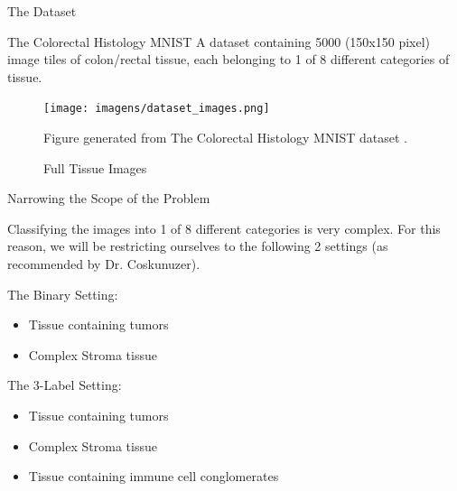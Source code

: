 \documentclass[11pt]{beamer}
\begin{document}
\begin{frame}{The Dataset}
    

    \begin{block}{The Colorectal Histology MNIST}
    A dataset containing 5000 (150x150 pixel) image tiles of colon/rectal tissue, each belonging to 1 of 8 different categories of tissue.
    \end{block}

    \begin{figure}
        \caption{Full Tissue Images}
        \label{fig:logo_UFES}
        \centering
        \texttt{[image: imagens/dataset\_images.png]}
        
        \medskip
        
        Figure generated from The Colorectal Histology MNIST dataset \cite{dataset}. 
    \end{figure}
\end{frame}

\begin{frame}{Narrowing the Scope of the Problem}
        
    Classifying the images into 1 of 8 different categories is very complex. For this reason, we will be restricting ourselves to the following 2 settings (as recommended by Dr. Coskunuzer).

    \vspace{5mm}

    The Binary Setting:
    \begin{itemize}
        \item Tissue containing tumors
        \item Complex Stroma tissue 
    \end{itemize}

    \vspace{5mm}
    
    The 3-Label Setting:
    \begin{itemize}
        \item Tissue containing tumors
        \item Complex Stroma tissue
        \item Tissue containing immune cell conglomerates
    \end{itemize}

    

\end{frame}
\end{document}
